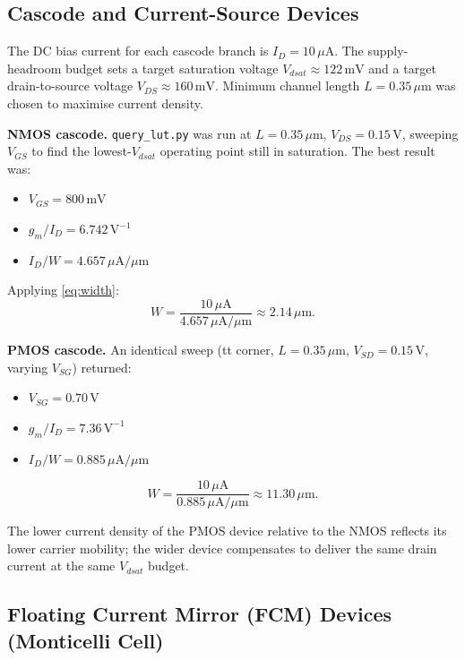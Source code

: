 \documentclass[conference]{IEEEtran}
\begin{document}
\subsection{Cascode and Current-Source Devices}

The DC bias current for each cascode branch is $I_D = 10\,\mu\text{A}$.
The supply-headroom budget sets a target saturation voltage
$V_{dsat} \approx 122\,\text{mV}$ and a target drain-to-source voltage
$V_{DS} \approx 160\,\text{mV}$.  Minimum channel length $L = 0.35\,\mu\text{m}$
was chosen to maximise current density.

\textbf{NMOS cascode.}
\texttt{query\_lut.py} was run at $L = 0.35\,\mu\text{m}$,
$V_{DS} = 0.15\,\text{V}$, sweeping $V_{GS}$ to find the lowest-$V_{dsat}$
operating point still in saturation.  The best result was:

\begin{itemize}
  \item $V_{GS} = 800\,\text{mV}$
  \item $g_m/I_D = 6.742\,\text{V}^{-1}$
  \item $I_D/W = 4.657\,\mu\text{A}/\mu\text{m}$
\end{itemize}

Applying \eqref{eq:width}:
\begin{equation}
  W = \frac{10\,\mu\text{A}}{4.657\,\mu\text{A}/\mu\text{m}} \approx 2.14\,\mu\text{m}.
\end{equation}

\textbf{PMOS cascode.}
An identical sweep (tt corner, $L = 0.35\,\mu\text{m}$,
$V_{SD} = 0.15\,\text{V}$, varying $V_{SG}$) returned:

\begin{itemize}
  \item $V_{SG} = 0.70\,\text{V}$
  \item $g_m/I_D = 7.36\,\text{V}^{-1}$
  \item $I_D/W = 0.885\,\mu\text{A}/\mu\text{m}$
\end{itemize}

\begin{equation}
  W = \frac{10\,\mu\text{A}}{0.885\,\mu\text{A}/\mu\text{m}} \approx 11.30\,\mu\text{m}.
\end{equation}

The lower current density of the PMOS device relative to the NMOS reflects
its lower carrier mobility; the wider device compensates to deliver the same
drain current at the same $V_{dsat}$ budget.

\subsection{Floating Current Mirror (FCM) Devices (Monticelli Cell)}
\end{document}
